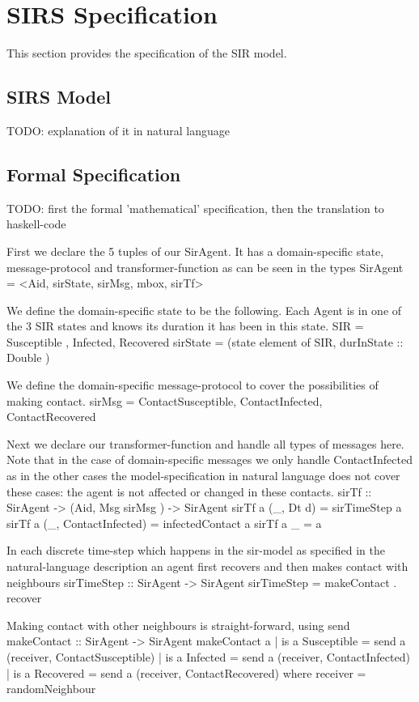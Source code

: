 \section{SIRS Specification}
This section provides the specification of the SIR model.

\subsection{SIRS Model}
TODO: explanation of it in natural language 
 
\subsection{Formal Specification}
TODO: first the formal 'mathematical' specification, then the translation to haskell-code

First we declare the 5 tuples of our SirAgent. It has a domain-specific state, message-protocol and transformer-function as can be seen in the types
SirAgent = <Aid, sirState, sirMsg, mbox, sirTf>

We define the domain-specific state to be the following. Each Agent is in one of the 3 SIR states and knows its duration it has been in this state.
SIR = { Susceptible , Infected, Recovered }
sirState = (state element of SIR, durInState :: Double )

We define the domain-specific message-protocol to cover the possibilities of making contact.
sirMsg = { ContactSusceptible, ContactInfected, ContactRecovered }

Next we declare our transformer-function and handle all types of messages here. Note that in the case of domain-specific messages we only handle ContactInfected as in the other cases the model-specification in natural language does not cover these cases: the agent is not affected or changed in these contacts.
sirTf :: SirAgent -> (Aid, Msg sirMsg ) -> SirAgent
sirTf a (_, Dt d) 				= sirTimeStep a 
sirTf a (_, ContactInfected) 	= infectedContact a
sirTf a _ 						= a 

In each discrete time-step which happens in the sir-model as specified in the natural-language description an agent first recovers and then makes contact with neighbours
sirTimeStep :: SirAgent -> SirAgent
sirTimeStep = makeContact . recover

Making contact with other neighbours is straight-forward, using send 
makeContact :: SirAgent -> SirAgent
makeContact a 
	| is a Susceptible 	= send a (receiver, ContactSusceptible)
	| is a Infected 	= send a (receiver, ContactInfected)
	| is a Recovered 	= send a (receiver, ContactRecovered)
		where
			receiver = randomNeighbour
			

